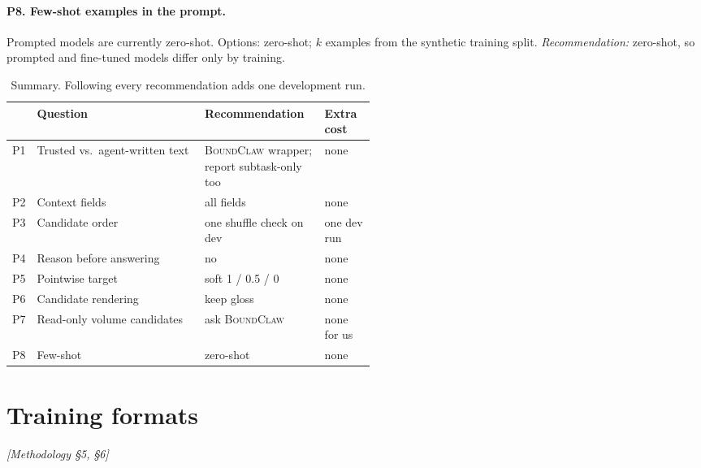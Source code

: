 \documentclass[10pt]{article}
\newcommand{\BC}{{\mdseries\textsc{BoundClaw}}}
\newcommand{\M}[1]{\textit{[Methodology #1]}}
\begin{document}
\paragraph{P8. Few-shot examples in the prompt.} Prompted models are currently zero-shot. Options: zero-shot; $k$ examples
from the synthetic training split. \emph{Recommendation:} zero-shot, so prompted and fine-tuned models differ only by
training.

\begin{table}[H]\centering\small
\begin{tabularx}{\linewidth}{L{0.05\linewidth}Y L{0.33\linewidth}L{0.14\linewidth}}
\toprule
& Question & Recommendation & Extra cost \\
\midrule
P1 & Trusted vs.\ agent-written text & \BC{} wrapper; report subtask-only too & none \\
P2 & Context fields & all fields & none \\
P3 & Candidate order & one shuffle check on dev & one dev run \\
P4 & Reason before answering & no & none \\
P5 & Pointwise target & soft 1 / 0.5 / 0 & none \\
P6 & Candidate rendering & keep gloss & none \\
P7 & Read-only volume candidates & ask \BC{} & none for us \\
P8 & Few-shot & zero-shot & none \\
\bottomrule
\end{tabularx}
\caption{Summary. Following every recommendation adds one development run.}\label{tab:proposals}
\end{table}

\section{Training formats}\label{sec:training}
\M{\S5, \S6}
\end{document}
